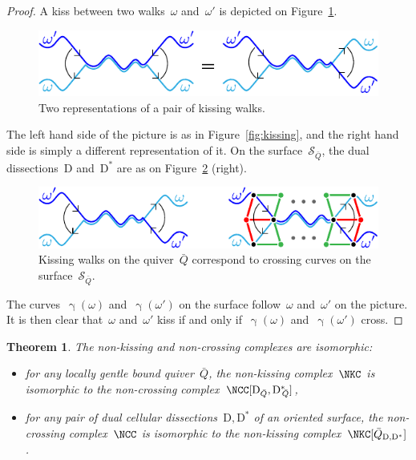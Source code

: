 \documentclass{amsart}
\newtheorem{theorem}{Theorem}[section]
\theoremstyle{definition}
\newcommand{\fref}[1]{Figure~\ref{#1}} %
\newcommand{\surface}{\mathcal{S}} %
\newcommand{\dual}{^*} %
\newcommand{\dissection}{\mathrm{D}} %
\newcommand{\curveof}{\operatorname{\gamma}} %
\begin{document}
\begin{proof}
A kiss between two walks~$\omega$ and~$\omega'$ is depicted on \fref{fig:kissings}.

\begin{figure}[h]
	\capstart
	\centerline{\includegraphics[scale=1]{kissings}}
	\caption{Two representations of a pair of kissing walks.}
	\label{fig:kissings}
\end{figure}
The left hand side of the picture is as in \fref{fig:kissing}, and the right hand side is simply a different representation of it.
On the surface~$\surface_{\bar Q}$, the dual dissections~$\dissection$ and~$\dissection\dual$ are as on \fref{fig:kissingVSCrossing} (right).

\begin{figure}[h]
	\capstart
	\centerline{\includegraphics[scale=1]{kissingVSCrossing}}
	\caption{Kissing walks on the quiver~$\bar Q$ correspond to crossing curves on the surface~$\surface_{\bar Q}$.}
	\label{fig:kissingVSCrossing}
\end{figure}

The curves~$\curveof(\omega)$ and~$\curveof(\omega')$ on the surface follow~$\omega$ and~$\omega'$ on the picture.
It is then clear that~$\omega$ and~$\omega'$ kiss if and only if~$\curveof(\omega)$ and~$\curveof(\omega')$ cross. 
\end{proof}

\begin{theorem}
\label{thm:complexesCoincide}
The non-kissing and non-crossing complexes are isomorphic:
\begin{itemize}
\item for any locally gentle bound quiver~$\bar Q$, the non-kissing complex~$\NKC$ is isomorphic to the non-crossing complex~$\NCC[\dissection_{\bar Q}, {\dissection\dual\!\!_{\bar Q}}]$,
\item for any pair of dual cellular dissections~$\dissection, \dissection\dual$ of an oriented surface, the non-crossing complex~$\NCC$ is isomorphic to the non-kissing complex~$\NKC[\bar Q_{\dissection, \dissection\dual}]$.
\end{itemize}
\end{theorem}
\end{document}
